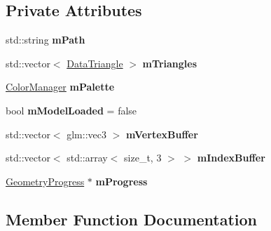 \subsection*{Private Attributes}
\begin{DoxyCompactItemize}
\item 
\mbox{\label{classpepr3d_1_1_model_importer_a246ce191de19d1ab72551c935012405c}} 
std\+::string {\bfseries m\+Path}
\item 
\mbox{\label{classpepr3d_1_1_model_importer_a4e1963a18c5ac3d49837b37198fb1f07}} 
std\+::vector$<$ \mbox{\hyperlink{classpepr3d_1_1_data_triangle}{Data\+Triangle}} $>$ {\bfseries m\+Triangles}
\item 
\mbox{\label{classpepr3d_1_1_model_importer_a0c75d881e5a8995f9d868d3648f99fed}} 
\mbox{\hyperlink{classpepr3d_1_1_color_manager}{Color\+Manager}} {\bfseries m\+Palette}
\item 
\mbox{\label{classpepr3d_1_1_model_importer_a4b325d259c20fa610a3c37505e07ed9b}} 
bool {\bfseries m\+Model\+Loaded} = false
\item 
\mbox{\label{classpepr3d_1_1_model_importer_a783426cd94762a3c47b208bd93131056}} 
std\+::vector$<$ glm\+::vec3 $>$ {\bfseries m\+Vertex\+Buffer}
\item 
\mbox{\label{classpepr3d_1_1_model_importer_a1f8ebea24ac6768d0aa19e35b9378511}} 
std\+::vector$<$ std\+::array$<$ size\+\_\+t, 3 $>$ $>$ {\bfseries m\+Index\+Buffer}
\item 
\mbox{\label{classpepr3d_1_1_model_importer_a15f30eb03ee6489b372b4ca2ca2dc9de}} 
\mbox{\hyperlink{structpepr3d_1_1_geometry_progress}{Geometry\+Progress}} $\ast$ {\bfseries m\+Progress}
\end{DoxyCompactItemize}


\subsection{Member Function Documentation}
\mbox{\label{classpepr3d_1_1_model_importer_aa537966d73404c3f4c463799030a1d2b}} 
